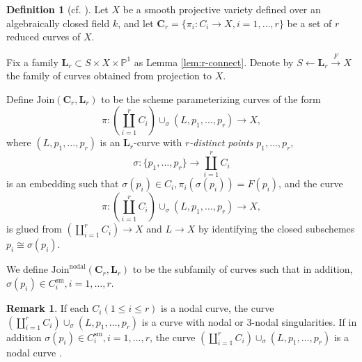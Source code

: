 \documentclass{amsart}
\theoremstyle{definition}
\newtheorem{defn}[theorem]{Definition}
\newtheorem{rem}[theorem]{Remark}
\theoremstyle{remark}
\newcommand{\mbb}{\mathbb}
\newcommand{\PP}{\mbb{P}}
\begin{document}
\begin{defn}[{cf. \cite[Definition 30]{Kollar_Tian}}]\label{def:join}
    Let $X$ be a smooth projective variety defined over an algebraically closed  field $k$, and let $\mathbf{C}_r=\{\pi_i:C_i \to X, i=1, \ldots, r\}$ be a set of $r$ reduced curves of $X$. 
    
    Fix a family $\mathbf{L}_r \subset S \times X \times \PP^1$ as Lemma \ref{lem:r-connect}.
    Denote by $S \leftarrow \mathbf{L}_r \xrightarrow{F} X$ the family of curves obtained from projection to $X$.

    Define
    $\text{Join}(\mathbf{C}_r, \mathbf{L}_r)$
    to be the scheme parameterizing curves of the form
    \[
    \pi: (\coprod_{i=1}^r C_i) \cup_{\sigma} (L, p_1, \ldots, p_r) \to X,
    \]
    where $(L, p_1, \ldots, p_r)$ is an $\mathbf{L}_r$-curve with \emph{$r$-distinct points} $p_1, \ldots, p_r$,  $$\sigma: \{p_1, \ldots, p_r\} \to \coprod_{i=1}^r C_i$$ is an embedding such that $\sigma(p_i) \in C_i, \pi_i(\sigma(p_i))=F(p_i)$, and the curve
    \[
    \pi: (\coprod_{i=1}^r C_i) \cup_{\sigma} (L, p_1, \ldots, p_r) \to X,
    \]
    is glued from $(\coprod_{i=1}^r C_i) \to X$ and $L \to X$ by identifying the closed subschemes $p_i \cong \sigma(p_i)$.

    We define 
    $\text{Join}^\text{nodal}(\mathbf{C}_r, \mathbf{L}_r)$
    to be the subfamily of curves such that in addition, $\sigma(p_i) \in C_i^{\text{sm}}, i=1, \ldots, r$.    
\end{defn}
\begin{rem}\label{rem:3dal}
    If each $C_i (1 \leq i \leq r)$ is a nodal curve, the curve $(\coprod_{i=1}^r C_i) \cup_{\sigma} (L, p_1, \ldots, p_r)$ is a curve with nodal or $3$-nodal singularities.
    If in addition $\sigma(p_i) \in C_i^{\text{sm}}, i=1, \ldots, r$, the curve
    $(\coprod_{i=1}^r C_i) \cup_{\sigma} (L, p_1, \ldots, p_r)$ is a nodal curve \cite[Theorem 3.4]{Knudsen_projectivity_2}.
\end{rem}
\end{document}
